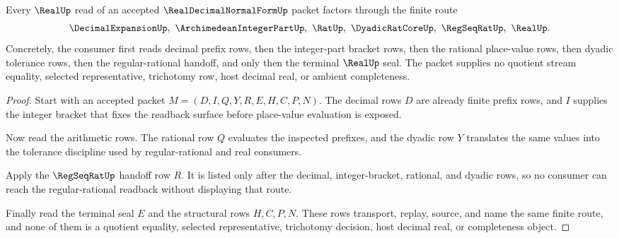 \begin{theorem}
\label{thm:real-decimal-normal-form-real-readback}
Every $\RealUp$ read of an accepted $\RealDecimalNormalFormUp$ packet factors
through the finite route
$$
\DecimalExpansionUp,\ \ArchimedeanIntegerPartUp,\ \RatUp,\ \DyadicRatCoreUp,\ \RegSeqRatUp,\ \RealUp .
$$
Concretely, the consumer first reads decimal prefix rows, then the
integer-part bracket rows, then the rational place-value rows, then dyadic
tolerance rows, then the regular-rational handoff, and only then the terminal
$\RealUp$ seal. The packet supplies no quotient stream equality, selected
representative, trichotomy row, host decimal real, or ambient completeness.
\end{theorem}
\begin{proof}
Start with an accepted packet $M=(D,I,Q,Y,R,E,H,C,P,N)$. The decimal rows
$D$ are already finite prefix rows, and $I$ supplies the integer bracket that
fixes the readback surface before place-value evaluation is exposed.

Now read the arithmetic rows. The rational row $Q$ evaluates the inspected
prefixes, and the dyadic row $Y$ translates the same values into the
tolerance discipline used by regular-rational and real consumers.

Apply the $\RegSeqRatUp$ handoff row $R$. It is listed only after the decimal,
integer-bracket, rational, and dyadic rows, so no consumer can reach the
regular-rational readback without displaying that route.

Finally read the terminal seal $E$ and the structural rows $H,C,P,N$. These
rows transport, replay, source, and name the same finite route, and none of
them is a quotient equality, selected representative, trichotomy decision,
host decimal real, or completeness object.
\end{proof}


